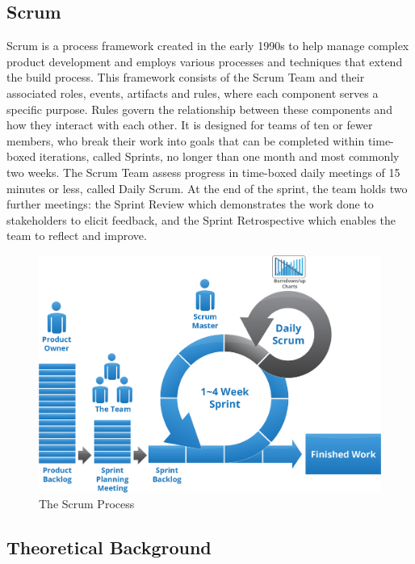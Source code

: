 \subsection{Scrum}\label{scrum}

\begin{flushleft}
	Scrum is a process framework created in the early 1990s to help manage complex
	product development and employs various processes and techniques that extend
	the build process. This framework consists of the Scrum Team and their associated
	roles, events, artifacts and rules, where each component serves a specific purpose.
	Rules govern the relationship between these components and how they interact with
	each other. It is designed for teams of ten or fewer members, who break their
	work into goals that can be completed within time-boxed iterations, called Sprints,
	no longer than one month and most commonly two weeks. The Scrum Team assess progress
	in time-boxed daily meetings of 15 minutes or less, called Daily Scrum. At the end
	of the sprint, the team holds two further meetings: the Sprint Review which demonstrates
	the work done to stakeholders to elicit feedback, and the Sprint Retrospective which
	enables the team to reflect and improve.
\end{flushleft}

\begin{figure}[ht]
	\centering
	\includegraphics[scale=0.15]{images/scrum.png}
	\caption{The Scrum Process}\label{fig:scrum}
\end{figure}

\subsection{Theoretical Background}\label{scrum-theoretical-background}

